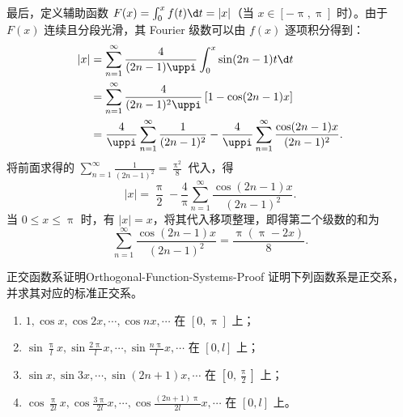 \begin{solution}
    最后，定义辅助函数 $F(x) = \int_{0}^{x} f(t) \d t = |x|$（当 $x \in [-\uppi, \uppi]$ 时）。由于 $F(x)$ 连续且分段光滑，其 Fourier 级数可以由 $f(x)$ 逐项积分得到：
    \begin{equation}\label{eq:term-integration-3}
        \begin{aligned}
            |x| & = \sum_{n=1}^{\infty} \frac{4}{(2n-1)\uppi} \int_{0}^{x} \sin(2n-1)t \d t                                                    \\
                & = \sum_{n=1}^{\infty} \frac{4}{(2n-1)^2\uppi} \left[ 1 - \cos(2n-1)x \right]                                                 \\
                & = \frac{4}{\uppi} \sum_{n=1}^{\infty} \frac{1}{(2n-1)^2} - \frac{4}{\uppi} \sum_{n=1}^{\infty} \frac{\cos(2n-1)x}{(2n-1)^2}.
        \end{aligned}
    \end{equation}
    将前面求得的 $\sum_{n=1}^{\infty} \frac{1}{(2n-1)^2} = \frac{\uppi^2}{8}$ 代入，得
    \begin{equation}\label{eq:fx-subs-3}
        |x| = \frac{\uppi}{2} - \frac{4}{\uppi} \sum_{n=1}^{\infty} \frac{\cos(2n-1)x}{(2n-1)^2}.
    \end{equation}
    当 $0 \leqslant x \leqslant \uppi$ 时，有 $|x| = x$，将其代入移项整理，即得第二个级数的和为
    \begin{equation}
        \boxed{\sum_{n=1}^{\infty} \frac{\cos(2n-1)x}{(2n-1)^2} = \frac{\uppi(\uppi - 2x)}{8}}.
    \end{equation}
\end{solution}

\begin{problem}{正交函数系证明}{Orthogonal-Function-Systems-Proof}
    证明下列函数系是正交系，并求其对应的标准正交系。
    \begin{enumerate}
        \item $1, \cos x, \cos 2x, \cdots, \cos nx, \cdots$ 在 $[0, \uppi]$ 上；
        \item $\sin \frac{\uppi}{l}x, \sin \frac{2\uppi}{l}x, \cdots, \sin \frac{n\uppi}{l}x, \cdots$ 在 $[0, l]$ 上；
        \item $\sin x, \sin 3x, \cdots, \sin(2n+1)x, \cdots$ 在 $[0, \frac{\uppi}{2}]$ 上；
        \item $\cos \frac{\uppi}{2l}x, \cos \frac{3\uppi}{2l}x, \cdots, \cos \frac{(2n+1)\uppi}{2l}x, \cdots$ 在 $[0, l]$ 上。
    \end{enumerate}
\end{problem}

